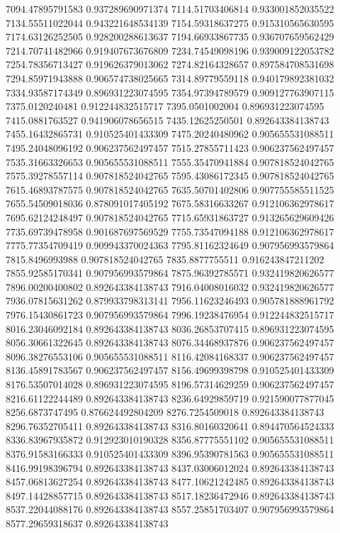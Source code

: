 {7094.47895791583 0.937289690971374
7114.51703406814 0.933001852035522
7134.55511022044 0.943221648534139
7154.59318637275 0.915310565630595
7174.63126252505 0.928200288613637
7194.66933867735 0.936707659562429
7214.70741482966 0.919407673676809
7234.74549098196 0.939009122053782
7254.78356713427 0.919626379013062
7274.82164328657 0.897584708531698
7294.85971943888 0.906574738025665
7314.89779559118 0.940179892381032
7334.93587174349 0.896931223074595
7354.97394789579 0.909127763907115
7375.0120240481 0.912244832515717
7395.0501002004 0.896931223074595
7415.0881763527 0.941906078656515
7435.12625250501 0.892643384138743
7455.16432865731 0.910525401433309
7475.20240480962 0.905655531088511
7495.24048096192 0.906237562497457
7515.27855711423 0.906237562497457
7535.31663326653 0.905655531088511
7555.35470941884 0.907818524042765
7575.39278557114 0.907818524042765
7595.43086172345 0.907818524042765
7615.46893787575 0.907818524042765
7635.50701402806 0.907755585511525
7655.54509018036 0.878091017405192
7675.58316633267 0.912106362978617
7695.62124248497 0.907818524042765
7715.65931863727 0.913265629609426
7735.69739478958 0.901687697569529
7755.73547094188 0.912106362978617
7775.77354709419 0.909943370024363
7795.81162324649 0.907956993579864
7815.8496993988 0.907818524042765
7835.8877755511 0.916243847211202
7855.92585170341 0.907956993579864
7875.96392785571 0.932419820626577
7896.00200400802 0.892643384138743
7916.04008016032 0.932419820626577
7936.07815631262 0.879933798313141
7956.11623246493 0.905781888961792
7976.15430861723 0.907956993579864
7996.19238476954 0.912244832515717
8016.23046092184 0.892643384138743
8036.26853707415 0.896931223074595
8056.30661322645 0.892643384138743
8076.34468937876 0.906237562497457
8096.38276553106 0.905655531088511
8116.42084168337 0.906237562497457
8136.45891783567 0.906237562497457
8156.49699398798 0.910525401433309
8176.53507014028 0.896931223074595
8196.57314629259 0.906237562497457
8216.61122244489 0.892643384138743
8236.64929859719 0.921590077877045
8256.6873747495 0.876624492804209
8276.7254509018 0.892643384138743
8296.76352705411 0.892643384138743
8316.80160320641 0.894470564524333
8336.83967935872 0.912923010190328
8356.87775551102 0.905655531088511
8376.91583166333 0.910525401433309
8396.95390781563 0.905655531088511
8416.99198396794 0.892643384138743
8437.03006012024 0.892643384138743
8457.06813627254 0.892643384138743
8477.10621242485 0.892643384138743
8497.14428857715 0.892643384138743
8517.18236472946 0.892643384138743
8537.22044088176 0.892643384138743
8557.25851703407 0.907956993579864
8577.29659318637 0.892643384138743
}
